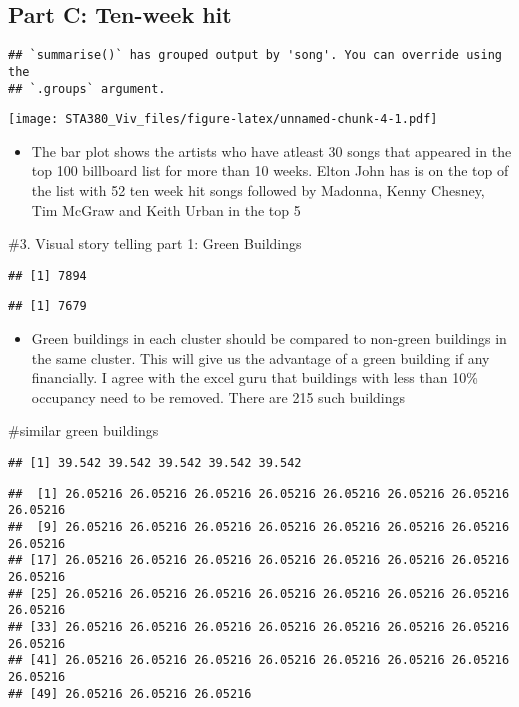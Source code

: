 \documentclass[
  12pt,
]{article}
\providecommand{\tightlist}{%
  \setlength{\itemsep}{0pt}\setlength{\parskip}{0pt}}
\begin{document}
\hypertarget{part-c-ten-week-hit}{%
\subsection{Part C: Ten-week hit}\label{part-c-ten-week-hit}}

\begin{verbatim}
## `summarise()` has grouped output by 'song'. You can override using the
## `.groups` argument.
\end{verbatim}

\texttt{[image: STA380\_Viv\_files/figure-latex/unnamed-chunk-4-1.pdf]}

\begin{itemize}
\tightlist
\item
  The bar plot shows the artists who have atleast 30 songs that appeared
  in the top 100 billboard list for more than 10 weeks. Elton John has
  is on the top of the list with 52 ten week hit songs followed by
  Madonna, Kenny Chesney, Tim McGraw and Keith Urban in the top 5
\end{itemize}

\nextpage

\#3. Visual story telling part 1: Green Buildings

\begin{verbatim}
## [1] 7894
\end{verbatim}

\begin{verbatim}
## [1] 7679
\end{verbatim}

\begin{itemize}
\tightlist
\item
  Green buildings in each cluster should be compared to non-green
  buildings in the same cluster. This will give us the advantage of a
  green building if any financially. I agree with the excel guru that
  buildings with less than 10\% occupancy need to be removed. There are
  215 such buildings
\end{itemize}

\#similar green buildings

\begin{verbatim}
## [1] 39.542 39.542 39.542 39.542 39.542
\end{verbatim}

\begin{verbatim}
##  [1] 26.05216 26.05216 26.05216 26.05216 26.05216 26.05216 26.05216 26.05216
##  [9] 26.05216 26.05216 26.05216 26.05216 26.05216 26.05216 26.05216 26.05216
## [17] 26.05216 26.05216 26.05216 26.05216 26.05216 26.05216 26.05216 26.05216
## [25] 26.05216 26.05216 26.05216 26.05216 26.05216 26.05216 26.05216 26.05216
## [33] 26.05216 26.05216 26.05216 26.05216 26.05216 26.05216 26.05216 26.05216
## [41] 26.05216 26.05216 26.05216 26.05216 26.05216 26.05216 26.05216 26.05216
## [49] 26.05216 26.05216 26.05216
\end{verbatim}
\end{document}
